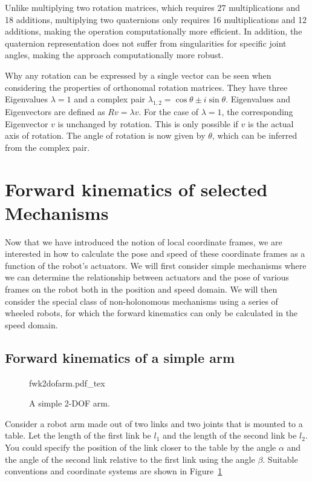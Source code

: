 Unlike multiplying two rotation matrices, which requires 27 multiplications and 18 additions, multiplying two quaternions only requires 16 multiplications and 12 additions, making the operation computationally more efficient. In addition, the quaternion representation does not suffer from singularities for specific joint angles, making the approach computationally more robust.

Why any rotation can be expressed by a single vector can be seen when considering the properties of orthonomal rotation matrices. They have three Eigenvalues $\lambda=1$ and a complex pair $\lambda_{1,2}=\cos \theta \pm i \sin \theta$. Eigenvalues and Eigenvectors are defined as $Rv=\lambda v$. For the case of $\lambda=1$, the corresponding Eigenvector $v$ is unchanged by rotation. This is only possible if $v$ is the actual axis of rotation. The angle of rotation is now given by $\theta$, which can be inferred from the complex pair.

\section{Forward kinematics of selected Mechanisms}
Now that we have introduced the notion of local coordinate frames, we are interested in how to calculate the pose and speed of these coordinate frames as a function of the robot's actuators. We will first consider simple mechanisms where we can determine the relationship between actuators and the pose of various frames on the robot both in the position and speed domain. We will then consider the special class of non-holonomous mechanisms using a series of wheeled robots, for which the forward kinematics can only be calculated in the speed domain.

\subsection{Forward kinematics of a simple arm}

\begin{figure}[!htb]%
    \centering
    \def\svgwidth{0.32\textwidth}
    {fwk2dofarm.pdf_tex}
    \caption{A simple 2-DOF arm.}\label{fig:fwk2dofarm}
\end{figure}

Consider a robot arm made out of two links and two joints that is mounted to a table. Let the length of the first link be $l_1$ and the length of the second link be $ l_2$. You could specify the position of the link closer to the table by the angle $ \alpha$ and the angle of the second link relative to the first link using the angle $ \beta$. Suitable conventions and coordinate systems are shown in Figure~\ref{fig:fwk2dofarm}

